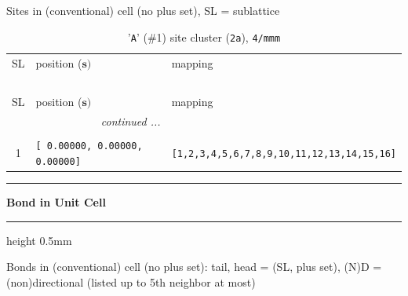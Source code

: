 \documentclass[fleqn,10pt,landscape]{jsarticle}
\begin{document}
\noindent Sites in (conventional) cell (no plus set), SL = sublattice

\renewcommand{\arraystretch}{1.6}
\begin{longtable}[l]{cll}
\captionsetup{justification=raggedright, singlelinecheck=off}
\caption{'\texttt{A}' (\#1) site cluster (\texttt{2a}), \texttt{4/mmm}}
 \\
 \hline \hline
SL & position ($\bm{s})$ & mapping \\ \hline \endfirsthead

\multicolumn{2}{l}{\tablename\ \thetable{}} \\
 \hline \hline
SL & position ($\bm{s})$ & mapping \\ \hline \endhead

 \hline \hline
\multicolumn{2}{r}{\footnotesize\it continued ...} \\ \endfoot

 \hline \hline
\multicolumn{2}{r}{} \\ \endlastfoot

1 & \texttt{[ 0.00000, 0.00000, 0.00000]} & \texttt{[1,2,3,4,5,6,7,8,9,10,11,12,13,14,15,16]} \\
\end{longtable}
\vspace{5mm}
\noindent \rule[0.5mm]{5mm}{0.5mm}\hspace{3mm}\textbf{Bond in Unit Cell}\hspace{3mm}\leaders\hrule height 0.5mm\hfill\kern0pt
\vspace{3mm}

\noindent Bonds in (conventional) cell (no plus set): tail, head = (SL, plus set), (N)D = (non)directional (listed up to 5th neighbor at most)
\end{document}
